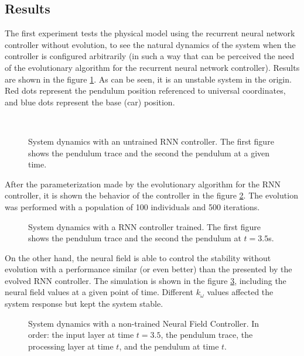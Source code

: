 \documentclass{sig-alternate}
\begin{document}
\subsection*{Results}
The first experiment tests the physical model using the recurrent
neural network controller without evolution, to see the natural
dynamics of the system when the controller is configured arbitrarily
(in such a way that can be perceived the need of the evolutionary
algorithm for the recurrent neural network controller). Results are
shown in the figure \ref{inestabilidad}. As can be seen, it is an
unstable system in the origin. Red dots represent the pendulum
position referenced to universal coordinates, and blue dots represent
the base (car) position.


\begin{figure}[t]
  \centering
  \\
  \caption{System dynamics with an untrained RNN controller. The first
  figure shows the pendulum trace and the second the pendulum at a
  given time.}
  \label{inestabilidad}
\end{figure}

After the parameterization made by the evolutionary algorithm for the
RNN controller, it is shown the behavior of the controller in the
figure \ref{rnnSimulation}. The evolution was performed with a
population of 100 individuals and 500 iterations.

\begin{figure}[t]
  \centering
  \caption{System dynamics with a RNN controller trained. The first
  figure shows the pendulum trace and the second the pendulum at $t=3.5$s.}
  \label{rnnSimulation}
\end{figure}

On the other hand, the neural field is able to control the stability
without evolution with a performance similar (or even better) than the
presented by the evolved RNN controller. The simulation is shown in
the figure \ref{fieldSimulation}, including the neural field values at
a given point of time. Different $k_{\omega}$ values affected the
system response but kept the system stable.


\begin{figure}[p]
  \centering
  \caption{System dynamics with a non-trained Neural Field
    Controller. In order: the input layer at time $t=3.5$, the
    pendulum trace, the processing layer at time $t$, and the pendulum
    at time $t$.}
  \label{fieldSimulation}
\end{figure}
\end{document}
